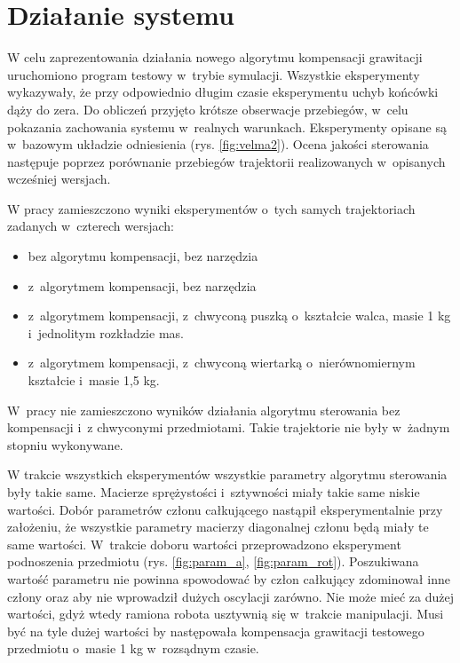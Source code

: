 
\chapter{Działanie systemu\label{chap:weryfikacja_systemu}}
\graphicspath{{./velma/przerobione_testy/out/}{./images}}



W celu zaprezentowania działania nowego algorytmu kompensacji grawitacji uruchomiono program testowy w~trybie symulacji. Wszystkie eksperymenty wykazywały, że przy odpowiednio długim czasie eksperymentu uchyb końcówki dąży do zera. Do obliczeń przyjęto krótsze obserwacje przebiegów, w~celu pokazania zachowania systemu w~realnych warunkach.  Eksperymenty opisane są w~bazowym układzie odniesienia (rys. \ref{fig:velma2}).  Ocena jakości sterowania następuje poprzez porównanie przebiegów trajektorii realizowanych w~opisanych wcześniej wersjach.

W pracy zamieszczono wyniki eksperymentów o~tych samych trajektoriach zadanych w~czterech wersjach:
\begin{itemize}
	\item bez algorytmu kompensacji, bez narzędzia
	\item z~algorytmem kompensacji, bez narzędzia
	\item z~algorytmem kompensacji, z~chwyconą puszką o~kształcie walca, masie 1 kg i~jednolitym rozkładzie mas.
	\item z~algorytmem kompensacji, z~chwyconą wiertarką o~nierównomiernym kształcie i~masie 1,5 kg.
\end{itemize}
W~pracy nie zamieszczono wyników działania algorytmu sterowania bez kompensacji i~z chwyconymi przedmiotami. Takie trajektorie nie były  w~żadnym stopniu wykonywane. 
 
W trakcie wszystkich eksperymentów wszystkie parametry algorytmu sterowania były takie same. Macierze sprężystości i~sztywności miały takie same niskie wartości. Dobór parametrów członu całkującego nastąpił eksperymentalnie przy założeniu, że wszystkie parametry macierzy diagonalnej członu będą miały te same wartości. W~trakcie doboru wartości przeprowadzono eksperyment podnoszenia przedmiotu (rys. \ref{fig:param_a}, \ref{fig:param_rot}). Poszukiwana wartość parametru nie powinna spowodować by człon całkujący zdominował inne człony oraz aby nie wprowadził dużych oscylacji zarówno. Nie może mieć za dużej wartości, gdyż wtedy ramiona robota usztywnią się w~trakcie manipulacji. Musi być na tyle dużej wartości by następowała kompensacja grawitacji testowego przedmiotu o~masie 1 kg w~rozsądnym czasie. 

